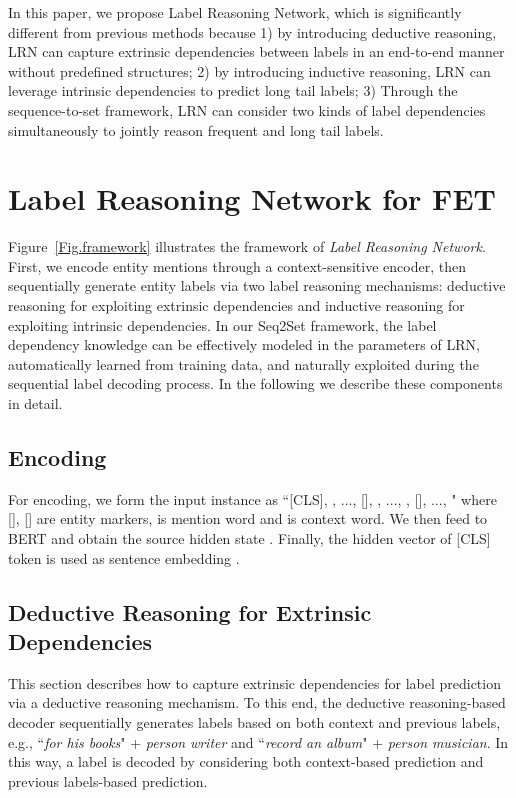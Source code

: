 \documentclass[11pt]{article}
\begin{document}
In this paper, we propose Label Reasoning Network, which is significantly different from previous methods because 1) by introducing deductive reasoning, LRN can capture extrinsic dependencies between labels in an end-to-end manner without predefined structures; 2) by introducing inductive reasoning, LRN can leverage intrinsic dependencies to predict long tail labels; 3) Through the sequence-to-set framework, LRN can consider two kinds of label dependencies simultaneously to jointly reason frequent and long tail labels.

\section{Label Reasoning Network for FET}
Figure~\ref{Fig.framework} illustrates the framework of \textit{Label Reasoning Network}. First, we encode entity mentions through a context-sensitive encoder, then sequentially generate entity labels via two label reasoning mechanisms: deductive reasoning for exploiting extrinsic dependencies and inductive reasoning for exploiting intrinsic dependencies. In our Seq2Set framework, the label dependency knowledge can be effectively modeled in the parameters of LRN, automatically learned from training data, and naturally exploited during the sequential label decoding process. In the following we describe these components in detail. 

\subsection{Encoding}
For encoding, we form the input instance  as ``[CLS], , ..., [], , ..., , [], ..., " where [], [] are entity markers,  is mention word and  is context word. We then feed  to BERT and obtain the source hidden state . Finally, the hidden vector of [CLS] token is used as sentence embedding .

\subsection{Deductive Reasoning for Extrinsic Dependencies}
This section describes how to capture extrinsic dependencies for label prediction via a deductive reasoning mechanism. To this end, the deductive reasoning-based decoder sequentially generates labels based on both context and previous labels, e.g., ``\textit{for his books}" + \textit{person}  \textit{writer} and ``\textit{record an album}" + \textit{person}  \textit{musician}. In this way, a label is decoded by considering both context-based prediction and previous labels-based prediction.
\end{document}
